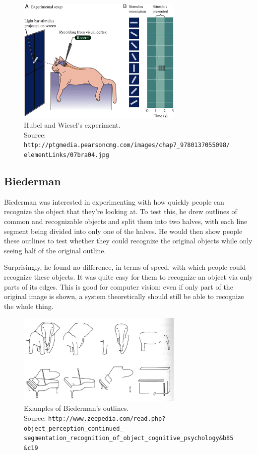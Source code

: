 \documentclass{article}
\begin{document}
\begin{figure}[H]
\centering
\includegraphics[width=8cm]{hubel_wiesel_cat.jpg}
\caption{Hubel and Wiesel's experiment. \\
Source: \texttt{http://ptgmedia.pearsoncmg.com/images/chap7\_9780137055098/\\
elementLinks/07bra04.jpg}}
\end{figure}

\subsection{Biederman}
Biederman was interested in experimenting with how quickly people can recognize the object that they're looking at. To test this, he drew outlines of common and recognizable objects and split them into two halves, with each line segment being divided into only one of the halves. He would then show people these outlines to test whether they could recognize the original objects while only seeing half of the original outline. \newline

Surprisingly, he found no difference, in terms of speed, with which people could recognize these objects. It was quite easy for them to recognize an object via only parts of its edges. This is good for computer vision: even if only part of the original image is shown, a system theoretically should still be able to recognize the whole thing.

\begin{figure}[H]
\centering
\includegraphics[width=8cm]{biederman_outlines.png}
\caption{Examples of Biederman's outlines. \\
Source: \texttt{http://www.zeepedia.com/read.php?object\_perception\_continued\_ \\ segmentation\_recognition\_of\_object\_cognitive\_psychology\&b\=85\&c\=19}}
\end{figure}
\end{document}
